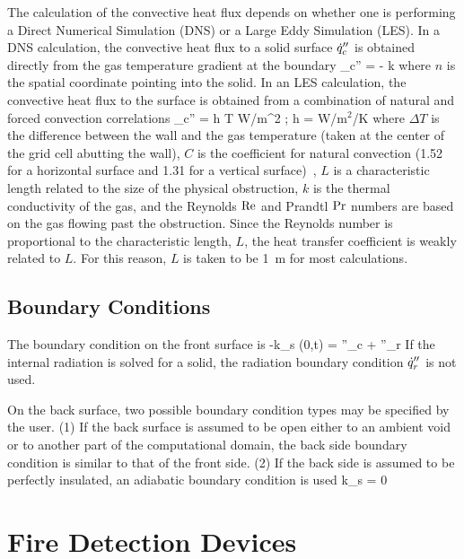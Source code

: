 \documentclass[11pt]{book}
\begin{document}
The calculation of the convective heat flux depends on whether one is
performing a Direct Numerical Simulation (DNS) or a
Large Eddy Simulation (LES).
In a DNS calculation, the convective heat flux to a solid surface $\dot{q}''_c$
is obtained directly from the gas temperature gradient at the boundary
\be \dq_c'' = - k \;  \ee
where $n$ is the spatial coordinate pointing into the solid.
In an LES calculation, the convective heat flux to the surface is
obtained from a combination of natural and forced
convection correlations
\be \dq_c'' = h \; \Delta T
    \quad \hbox{W/m}^2 \quad ; \quad h =
    \max \;   \quad
    \hbox{W/m$^2$/K} \ee
where $\Delta T$ is the difference between the wall and the gas temperature
(taken at the center of the grid cell abutting the wall),
$C$ is the coefficient for natural convection (1.52 for a horizontal surface
and 1.31 for a vertical surface)~\cite{Holman:1},
$L$ is a characteristic length related to the size of the physical
obstruction, $k$ is the thermal conductivity of the
gas, and the Reynolds $\hbox{Re}$ and Prandtl $\hbox{Pr}$ numbers are based on the
gas flowing
past the obstruction. Since the Reynolds number is proportional to the
characteristic length, $L$, the heat transfer coefficient is weakly
related to $L$. For this reason, $L$ is taken to be 1~m for most
calculations.


\subsection{Boundary Conditions}
\label{matbc}

The boundary condition on the front surface is
\be  -k_s (0,t) =  \dq''_c + \dq''_r \ee
If the internal radiation is solved for a solid, the radiation
boundary condition $\dot{q}''_r$ is not used.

On the back surface, two possible boundary condition types may be
specified by the user. (1) If the back surface is assumed to be open
either to an ambient
void or to another part of the computational domain,
the back side boundary condition is similar to that of
the front side. (2) If the back side is assumed to be perfectly insulated,
an adiabatic boundary condition is used
\be  k_s  =  0 \ee




\clearpage
\section{Fire Detection Devices}
\end{document}
